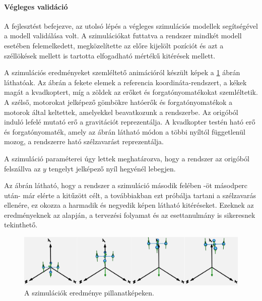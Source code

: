             \paragraph{Végleges validáció}
            A fejlesztést befejezve, az utolsó lépés a végleges szimulációs modellek segítségével a modell validálása volt. A szimulációkat futtatva a rendszer mindkét modell esetében felemelkedett, megközelítette az előre kijelölt pozíciót és azt a széllökések mellett is tartotta elfogadható mértékű kitérések mellett.
            
            A szimulációs eredményeket szemléltető animációról készült képek a \ref{fig:SimRes} ábrán láthatóak.
            Az ábrán a fekete elemek a referencia koordináta-rendszert, a kékek magát a kvadkoptert, míg a zöldek az erőket és forgatónyomatékokat szemléltetik.
            A szélső, motorokat jelképező gömbökre hatóerők és forgatónyomatékok a motorok által keltettek, amelyekkel beavatkozunk a rendszerbe. Az origóból induló lefelé mutató erő a gravitációt reprezentálja.
            A kvadkopter testén ható erő és forgatónyomaték, amely az ábrán látható módon a többi nyíltól függetlenül mozog, a rendszerre ható szélzavarást reprezentálja.

            A szimuláció paraméterei úgy lettek meghatározva, hogy a rendszer az origóból felszállva az $y$ tengelyt jelképező nyíl hegyénél lebegjen.
            
            Az ábrán látható, hogy a rendszer a szimuláció második felében -öt másodperc után- már elérte a kitűzött célt, a továbbiakban ezt próbálja tartani a szélzavarás ellenére, ez okozza a harmadik és negyedik képen látható kitéréseket.
            Ezeknek az eredményeknek az alapján, a tervezési folyamat és az esettanulmány is sikeresnek tekinthető.

            \begin{figure}[!ht]
                \centering
                \includegraphics[width=150mm, keepaspectratio]{figures/SimRes.png}
                \caption{A szimulációk eredménye pillanatképeken.}
                \label{fig:SimRes}
            \end{figure}


